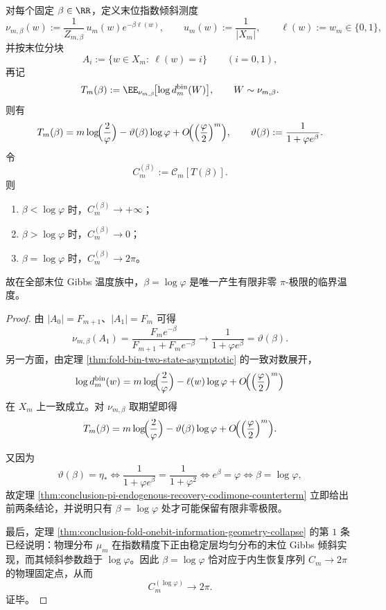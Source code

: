 \begin{corollary}[指数倾斜温度的临界选择：\texorpdfstring{$\beta=\log\varphi$}{beta=log phi} 唯一]\label{cor:conclusion-lastbit-gibbs-critical-temperature-logphi}
对每个固定 \(\beta\in\RR\)，定义末位指数倾斜测度
\[
\nu_{m,\beta}(w):=\frac{1}{Z_{m,\beta}}\,u_m(w)e^{-\beta\ell(w)},
\qquad
u_m(w):=\frac{1}{|X_m|},
\qquad
\ell(w):=w_m\in\{0,1\},
\]
并按末位分块
\[
A_i:=\{w\in X_m:\ \ell(w)=i\}
\qquad (i=0,1),
\]
再记
\[
T_m(\beta):=\EE_{\nu_{m,\beta}}\!\bigl[\log d_m^{\mathrm{bin}}(W)\bigr],
\qquad
W\sim \nu_{m,\beta}.
\]
则有
\[
T_m(\beta)
=
m\log\!\Bigl(\frac{2}{\varphi}\Bigr)-\vartheta(\beta)\log\varphi
+O\!\Bigl(\Bigl(\frac{\varphi}{2}\Bigr)^m\Bigr),
\qquad
\vartheta(\beta):=\frac{1}{1+\varphi e^\beta}.
\]
令
\[
C_m^{(\beta)}:=\mathcal C_m[T(\beta)].
\]
则
\begin{enumerate}
  \item \(\beta<\log\varphi\) 时，\(C_m^{(\beta)}\to+\infty\)；
  \item \(\beta>\log\varphi\) 时，\(C_m^{(\beta)}\to0\)；
  \item \(\beta=\log\varphi\) 时，\(C_m^{(\beta)}\to 2\pi\)。
\end{enumerate}
故在全部末位 Gibbs 温度族中，\(\beta=\log\varphi\) 是唯一产生有限非零 \(\pi\)-极限的临界温度。
\end{corollary}
\begin{proof}
由 \(|A_0|=F_{m+1}\)、\(|A_1|=F_m\) 可得
\[
\nu_{m,\beta}(A_1)
=
\frac{F_m e^{-\beta}}{F_{m+1}+F_m e^{-\beta}}
\to
\frac{1}{1+\varphi e^\beta}
=
\vartheta(\beta).
\]
另一方面，由定理 \ref{thm:fold-bin-two-state-asymptotic} 的一致对数展开，
\[
\log d_m^{\mathrm{bin}}(w)
=
m\log\!\Bigl(\frac{2}{\varphi}\Bigr)-\ell(w)\log\varphi
+O\!\Bigl(\Bigl(\frac{\varphi}{2}\Bigr)^m\Bigr)
\]
在 \(X_m\) 上一致成立。对 \(\nu_{m,\beta}\) 取期望即得
\[
T_m(\beta)
=
m\log\!\Bigl(\frac{2}{\varphi}\Bigr)-\vartheta(\beta)\log\varphi
+O\!\Bigl(\Bigl(\frac{\varphi}{2}\Bigr)^m\Bigr).
\]

又因为
\[
\vartheta(\beta)=\eta_*
\iff
\frac{1}{1+\varphi e^\beta}=\frac{1}{1+\varphi^2}
\iff
e^\beta=\varphi
\iff
\beta=\log\varphi,
\]
故定理 \ref{thm:conclusion-pi-endogenous-recovery-codimone-counterterm} 立即给出前两条结论，并说明只有 \(\beta=\log\varphi\) 处才可能保留有限非零极限。

最后，定理 \ref{thm:conclusion-fold-onebit-information-geometry-collapse} 的第 \(1\) 条已经说明：物理分布 \(\mu_m\) 在指数精度下正由稳定层均匀分布的末位 Gibbs 倾斜实现，而其倾斜参数趋于 \(\log\varphi\)。因此 \(\beta=\log\varphi\) 恰对应于内生恢复序列 \(C_m\to 2\pi\) 的物理固定点，从而
\[
C_m^{(\log\varphi)}\to 2\pi.
\]
证毕。
\end{proof}

